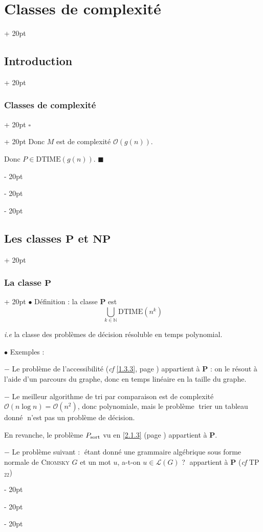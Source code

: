 \documentclass[a4paper, 12pt, twoside]{article}
\newcommand{\N}{\mathbb{N}} %
\newcommand{\lr}[1]{\left( #1 \right)}
\newcommand{\simplecit}[1]{\guillemotleft$\;$#1$\;$\guillemotright}
\newcommand{\ind}[1][20pt]{\advance\leftskip + #1}
\newcommand{\deind}[1][20pt]{\advance\leftskip - #1}
\newenvironment{indt}[2][20pt]{#2 \par \ind[#1]}{\par \deind} %
\newenvironment{proof}[1][{}]{\begin{indt}{$\square$ #1}}{$\blacksquare$ \end{indt}}
\begin{document}
\begin{indt}{\section{Classes de complexité}}
\begin{indt}{\subsection{Introduction}}
\begin{indt}{\subsubsection{Classes de complexité}}
\begin{proof}
                    Donc $M$ est de complexité $\mathcal O(g(n))$.

                    Donc $P \in \mathrm{DTIME}(g(n))$.
                \end{proof}
            \end{indt}
        \end{indt}

        \vspace{12pt}
        
        \begin{indt}{\subsection{Les classes $\mathbf P$ et $\mathbf{NP}$}}
            \begin{indt}{\subsubsection{La classe $\mathbf P$}}
                $\bullet$ Définition : la classe $\mathbf P$ est
                \[
                    \bigcup_{k \in \N} \mathrm{DTIME}\!\lr{n^k}
                \]

                \textit{i.e} la classe des problèmes de décision résoluble en temps polynomial.

                \vspace{12pt}
                
                $\bullet$ Exemples :

                $-$ Le problème de l'accessibilité (\textit{cf} \ref{1.3.3}, page \pageref{1.3.3}) appartient à $\mathbf P$ : on le résout à l'aide d'un parcours du graphe, donc en temps linéaire en la taille du graphe.

                $-$ Le meilleur algorithme de tri par comparaison est de complexité $\mathcal O(n \log n) = \mathcal O(n^2)$, donc polynomiale, mais le problème \simplecit{trier un tableau donné} n'est pas un problème de décision.

                En revanche, le problème $P_{\rm sort}$ vu en \ref{2.1.3} (page \pageref{2.1.3}) appartient à $\mathbf P$.

                $-$ Le problème suivant : \simplecit{étant donné une grammaire algébrique sous forme normale de \textsc{Chomsky} $G$ et un mot $u$, a-t-on $u \in \mathcal L(G)$ ?} appartient à $\mathbf P$ (\textit{cf} TP$_{22}$)
            \end{indt}


\end{indt}
\end{indt}
\end{document}
